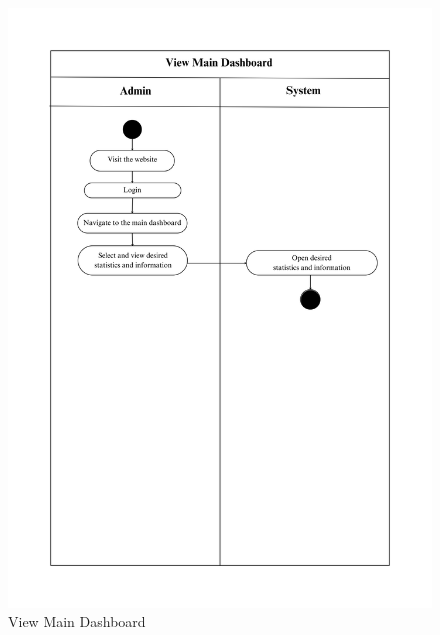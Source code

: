 \begin{figure}[h!]
    \centering
    \includegraphics[width=1\textwidth]{Images/Activity Diagrams/12 View Main Dashboard.png}
    \caption{View Main Dashboard}
    \label{fig:activity-dashboard}
\end{figure}

